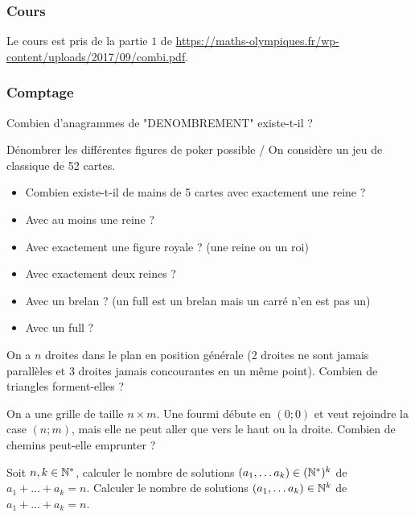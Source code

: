 \subsubsection{Cours}

Le cours est pris de la partie $1$ de \url{https://maths-olympiques.fr/wp-content/uploads/2017/09/combi.pdf}.


\subsubsection{Comptage}


\begin{exo}
Combien d'anagrammes de "DENOMBREMENT" existe-t-il ?
\end{exo}


\begin{exo}
Dénombrer les différentes figures de poker possible / On considère un jeu de classique de 52 cartes.
\begin{itemize}
\item Combien existe-t-il de mains de 5 cartes avec exactement une reine ?
\item Avec au moins une reine ?
\item Avec exactement une figure royale ? (une reine ou un roi)
\item Avec exactement deux reines ?
\item Avec un brelan ? (un full est un brelan mais un carré n'en est pas un)
\item Avec un full ?
\end{itemize}
\end{exo}


\begin{exo}
On a $n$ droites dans le plan en position générale (2 droites ne sont jamais parallèles et 3 droites jamais concourantes en un même point). Combien de triangles forment-elles ?
\end{exo}


\begin{exo}
On a une grille de taille $n \times m$. Une fourmi débute en $(0;0)$ et veut rejoindre la case $(n;m)$, mais elle ne peut aller que vers le haut ou la droite. Combien de chemins peut-elle emprunter ?
\end{exo}


\begin{exo}
Soit $n,k\in \mathbb N^*$, calculer le nombre de solutions $(a_1,\dots a_k)\in (\mathbb N^*)^k$ de $a_1+\dots +a_k=n$. Calculer le nombre de solutions $(a_1,\dots a_k)\in \mathbb N^k$ de $a_1+\dots +a_k=n$.
\end{exo}


